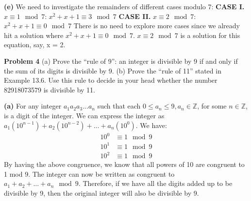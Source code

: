\documentclass[12pt,letterpaper]{hmcpset}
\begin{document}
\begin{solution}\textbf{(e)} We need to investigate the remainders of different cases modulo 7:
\newline \textbf{CASE I.} $x\equiv 1 \mod 7$:
$x^{2}+x+1 \equiv 3\mod 7$
\newline \textbf{CASE II.} $x\equiv 2 \mod 7$:
$x^{2}+x+1 \equiv 0\mod 7$
\newline There is no need to explore more cases since we already hit a solution where $x^{2}+x+1 \equiv 0\mod 7$. $x\equiv 2 \mod 7$ is a solution for this equation, say, x = 2.
\end{solution}
\begin{problem}\textbf{Problem 4} 
\newline(a) Prove the “rule of 9”: an integer is divisible by 9 if and only if the sum of its digits is divisible by 9.
\newline(b) Prove the “rule of 11” stated in Example 13.6. Use this rule to decide in your head whether the number 82918073579 is divisible by 11.
\end{problem}

\begin{solution}\textbf{(a)} For any integer $a_1a_2a_3...a_n$ such that each $0\le a_n\le9, a_n\in\mathbb{Z}$, for some $n\in\mathbb{Z}$, is a digit of the integer. We can express the integer as $a_1(10^{n-1})+a_2(10^{n-2})+...+a_n(10^{0})$.  We have:
\begin{align*}
10^{0} &\equiv 1\mod 9 \\
10^{1} &\equiv 1\mod 9 \\
10^{2} &\equiv 1\mod 9 
\end{align*}
By having the above congruence, we know that all powers of 10 are congruent to 1 mod 9. The integer can now be written as congruent to $a_1+a_2+...+a_n \mod 9$. Therefore, if we have all the digits added up to be divisible by 9, then the original integer will also be divisible by 9.
\end{solution}
\end{document}
